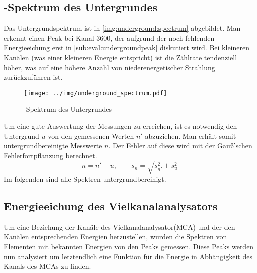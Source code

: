 \subsection{\textgamma-Spektrum des Untergrundes}
Das Untergrundspektrum ist in \autoref{img:underground:spectrum} abgebildet. Man erkennt einen Peak bei Kanal 3600, der aufgrund der noch 
fehlenden Energieeichung erst in \ref{sub:eval:undergroundpeak} diskutiert wird. Bei kleineren Kanälen (was einer kleineren Energie entspricht) ist 
die Zählrate tendenziell höher, was auf eine höhere Anzahl von niederenergetischer Strahlung zurückzuführen ist. 
\begin{figure}[H]
\begin{center}
  \texttt{[image: ../img/underground\_spectrum.pdf]}
  \caption{\textgamma-Spektrum des Untergrundes}
  \label{img:underground:spectrum}
\end{center}
\end{figure}
Um eine gute Auswertung der Messungen zu erreichen, ist es notwendig den Untergrund $u$ von den gemessenen Werten $n'$ abzuziehen. Man erhält 
somit untergrundbereinigte Messwerte $n$. Der Fehler auf diese wird mit der Gauß'schen Fehlerfortpflanzung berechnet.
\begin{equation}
  n = n' - u, \qquad s_n = \sqrt{s_{n'}^2 + s_u^2}
\end{equation}
Im folgenden sind alle Spektren untergrundbereinigt.

\subsection{Energieeichung des Vielkanalanalysators}
Um eine Beziehung der Kanäle des Vielkanalanalysator(MCA) und der den Kanälen entsprechenden Energien herzustellen, wurden die Spektren von Elementen 
mit bekannten Energien von den Peaks gemessen. Diese Peaks werden nun analysiert um letztendlich eine Funktion für die Energie in Abhängigkeit des 
Kanals des MCAs zu finden.
